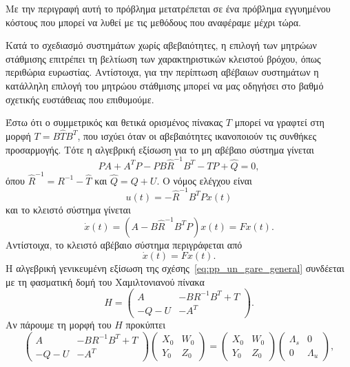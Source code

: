 Με την περιγραφή αυτή το πρόβλημα μετατρέπεται σε ένα πρόβλημα εγγυημένου
κόστους που μπορεί να λυθεί με τις μεθόδους που αναφέραμε μέχρι τώρα.

Κατά το σχεδιασμό συστημάτων χωρίς αβεβαιότητες, η επιλογή των μητρώων
στάθμισης επιτρέπει τη βελτίωση των χαρακτηριστικών κλειστού βρόχου, όπως
περιθώρια ευρωστίας. Αντίστοιχα, για την περίπτωση αβέβαιων συστημάτων η
κατάλληλη επιλογή του μητρώου στάθμισης μπορεί να μας οδηγήσει στο βαθμό
σχετικής ευστάθειας που επιθυμούμε.

Έστω ότι ο συμμετρικός και θετικά ορισμένος πίνακας \( T \) μπορεί να γραφτεί
στη μορφή \( T = B\hat{T}B^T \), που ισχύει όταν οι αβεβαιότητες ικανοποιούν
τις συνθήκες προσαρμογής. Τότε η αλγεβρική εξίσωση  για το μη
αβέβαιο σύστημα γίνεται
\begin{equation}\label{eq:pp_un_wei}
    PA + A^{T}P - PB\hat{R}^{-1}B^{T} - TP + \hat{Q} = 0,
\end{equation}
όπου \( \hat{R}^{-1} = R^{-1} - \hat{T} \) και \( \hat{Q} = Q + U \). Ο νόμος
ελέγχου είναι
\[
    u(t) = -\hat{R}^{-1}B^TPx(t)
\]
και το κλειστό σύστημα γίνεται
\begin{equation}\label{eq:pp_closed}
    \dot{x}(t) = (A - B\hat{R}^{-1}B^TP)x(t) = Fx(t).
\end{equation}
Αντίστοιχα, το κλειστό αβέβαιο σύστημα περιγράφεται από
\[
    \dot{x}(t) = Fx(t).
\]
Η αλγεβρική γενικευμένη εξίσωση  της σχέσης~\eqref{eq:pp_un_gare_general}
συνδέεται με τη φασματική δομή του Χαμιλτονιανού πίνακα
\begin{equation*}
    H =
    \begin{pmatrix}
        A & -BR^{-1}B^T + T \\
        -Q - U & -A^T
    \end{pmatrix}.
\end{equation*}
Αν πάρουμε τη μορφή  του \( H \) προκύπτει
\begin{equation}\label{eq:pp_hamil}
    \begin{pmatrix}
        A & -BR^{-1}B^T + T \\
        -Q - U & -A^T
    \end{pmatrix}
    \begin{pmatrix}
        X_0 & W_0 \\
        Y_0 & Z_0
    \end{pmatrix} =
    \begin{pmatrix}
        X_0 & W_0 \\
        Y_0 & Z_0
    \end{pmatrix}
    \begin{pmatrix}
        \Lambda_s & 0 \\
        0 & \Lambda_u
    \end{pmatrix},
\end{equation}
